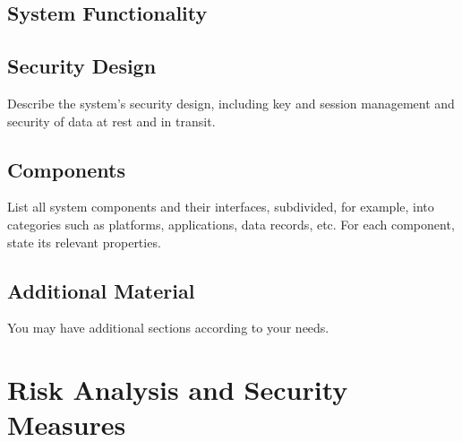 \documentclass[english]{article}
\begin{document}


\subsection{System Functionality}




\subsection{Security Design}

Describe the system's security design, including key and session management and 
security of data at rest and in transit.


\subsection{Components}

List all system components and their interfaces, subdivided, for example, into
  categories such as platforms, applications, data records, etc. For
  each component, state its relevant properties.



\subsection{Additional Material}

You may have additional sections according to your needs.


\section{Risk Analysis and Security Measures}
\end{document}
